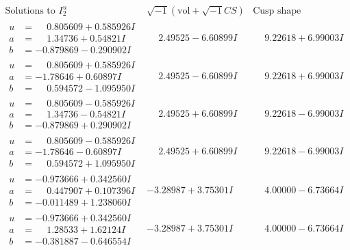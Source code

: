 \documentclass[1p]{elsarticle_modified}
\theoremstyle{definition}
\newcommand{\I}{\sqrt{-1}}
\begin{document}
$$\begin{array}{c|c|c}  
\text{Solutions to }I^u_{2}& \I (\text{vol} + \sqrt{-1}CS) & \text{Cusp shape}\\
 \hline 
\begin{aligned}
u &= \phantom{-}0.805609 + 0.585926 I \\
a &= \phantom{-}1.34736 + 0.54821 I \\
b &= -0.879869 - 0.290902 I\end{aligned}
 & \phantom{-}2.49525 - 6.60899 I & \phantom{-}9.22618 + 6.99003 I \\ \hline\begin{aligned}
u &= \phantom{-}0.805609 + 0.585926 I \\
a &= -1.78646 + 0.60897 I \\
b &= \phantom{-}0.594572 - 1.095950 I\end{aligned}
 & \phantom{-}2.49525 - 6.60899 I & \phantom{-}9.22618 + 6.99003 I \\ \hline\begin{aligned}
u &= \phantom{-}0.805609 - 0.585926 I \\
a &= \phantom{-}1.34736 - 0.54821 I \\
b &= -0.879869 + 0.290902 I\end{aligned}
 & \phantom{-}2.49525 + 6.60899 I & \phantom{-}9.22618 - 6.99003 I \\ \hline\begin{aligned}
u &= \phantom{-}0.805609 - 0.585926 I \\
a &= -1.78646 - 0.60897 I \\
b &= \phantom{-}0.594572 + 1.095950 I\end{aligned}
 & \phantom{-}2.49525 + 6.60899 I & \phantom{-}9.22618 - 6.99003 I \\ \hline\begin{aligned}
u &= -0.973666 + 0.342560 I \\
a &= \phantom{-}0.447907 + 0.107396 I \\
b &= -0.011489 + 1.238060 I\end{aligned}
 & -3.28987 + 3.75301 I & \phantom{-}4.00000 - 6.73664 I \\ \hline\begin{aligned}
u &= -0.973666 + 0.342560 I \\
a &= \phantom{-}1.28533 + 1.62124 I \\
b &= -0.381887 - 0.646554 I\end{aligned}
 & -3.28987 + 3.75301 I & \phantom{-}4.00000 - 6.73664 I \\ \hline\begin{aligned}

\end{aligned}
\end{array}$$
\end{document}
